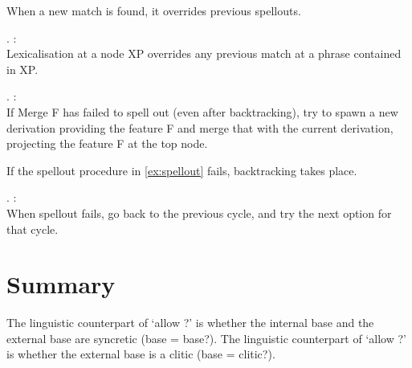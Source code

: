 When a new match is found, it overrides previous spellouts.

\ex.  \citep{starke2018}:\\
Lexicalisation at a node XP overrides any previous match at a phrase contained in XP.

\ex.  \citep{starke2018}:\\
If Merge F has failed to spell out (even after backtracking), try to spawn a new derivation providing the feature F and merge that with the current derivation, projecting the feature F at the top node.\label{ex:specformation}

If the spellout procedure in \ref{ex:spellout} fails, backtracking takes place.

\ex.  \citep{starke2018}:\\
When spellout fails, go back to the previous cycle, and try the next option for that cycle.\label{ex:backtracking}

\phantom{x}



\section{Summary}

The linguistic counterpart of `allow ?' is whether the internal base and the external base are syncretic (base = base?).
The linguistic counterpart of `allow ?' is whether the external base is a clitic (base = clitic?).

